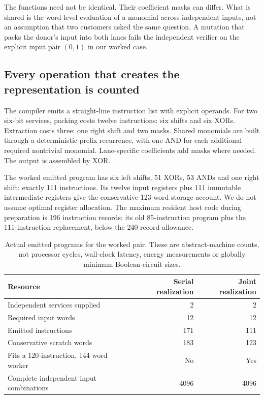 \documentclass[11pt,letterpaper]{article}
\theoremstyle{definition}\newtheorem{definition}[theorem]{Definition}
\theoremstyle{remark}\newtheorem{remark}[theorem]{Remark}
\begin{document}
The functions need not be identical. Their coefficient masks can differ. What is shared is the word-level evaluation of a monomial across independent inputs, not an assumption that two customers asked the same question. A mutation that packs the donor's input into both lanes fails the independent verifier on the explicit input pair $(0,1)$ in our worked case.

\subsection{Every operation that creates the representation is counted}
The compiler emits a straight-line instruction list with explicit operands. For two six-bit services, packing costs twelve instructions: six shifts and six XORs. Extraction costs three: one right shift and two masks. Shared monomials are built through a deterministic prefix recurrence, with one AND for each additional required nontrivial monomial. Lane-specific coefficients add masks where needed. The output is assembled by XOR.

The worked emitted program has six left shifts, 51 XORs, 53 ANDs and one right shift: exactly 111 instructions. Its twelve input registers plus 111 immutable intermediate registers give the conservative 123-word storage account. We do not assume optimal register allocation. The maximum resident host code during preparation is 196 instruction records: its old 85-instruction program plus the 111-instruction replacement, below the 240-record allowance.

\begin{table}[htbp]\centering\small
\caption{Actual emitted programs for the worked pair. These are abstract-machine counts, not processor cycles, wall-clock latency, energy measurements or globally minimum Boolean-circuit sizes.}
\begin{tabularx}{\linewidth}{@{}Yrr@{}}\toprule
Resource & Serial realization & Joint realization\\\midrule
Independent services supplied & 2 & 2\\
Required input words & 12 & 12\\
Emitted instructions & 171 & 111\\
Conservative scratch words & 183 & 123\\
Fits a 120-instruction, 144-word worker & No & Yes\\
Complete independent input combinations & 4096 & 4096\\\bottomrule
\end{tabularx}
\label{tab:program}
\end{table}
\end{document}
